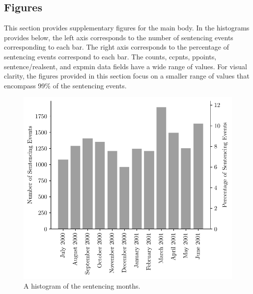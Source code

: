 \documentclass[11pt, oneside]{article}   	%
\theoremstyle{ModifiedStyle}
\begin{document}
\subsection{Figures}
\label{Sec:Appendix:Supplementary_Figures}
This section provides supplementary figures for the main body. In the histograms provides below, the left axis corresponds to the number of sentencing events corresponding to each bar. The right axis corresponds to the percentage of sentencing events correspond to each bar. The counts, ccpnts, ppoints, sentence/realsent, and expmin data fields have a wide range of values. For visual clarity, the figures provided in this section focus on a smaller range of values that encompass 99\% of the sentencing events.
	
\begin{figure}[H]
	\centering
	\includegraphics[scale=0.75]{Figures/Month_Histogram}
	\vspace{-2mm}
	\caption{A histogram of the sentencing months.}
	\label{Figure_Hester_Data_Month_Histogram}
\end{figure}
%
\end{document}
